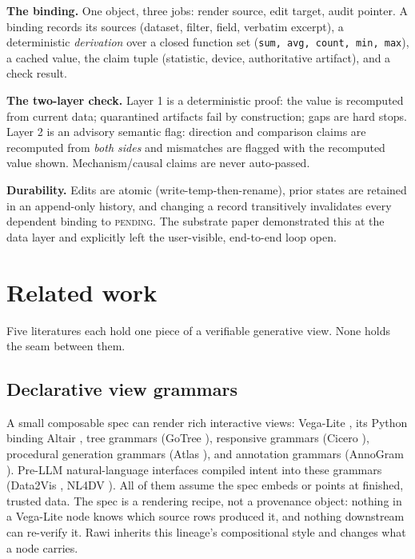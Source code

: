\documentclass[11pt]{article}
\begin{document}
\textbf{The binding.} One object, three jobs: render source, edit target, audit pointer.
A binding records its sources (dataset, filter, field, verbatim excerpt), a deterministic
\emph{derivation} over a closed function set (\texttt{sum, avg, count, min, max}), a cached
value, the claim tuple (statistic, device, authoritative artifact), and a check result.

\textbf{The two-layer check.} Layer 1 is a deterministic proof: the value is recomputed
from current data; quarantined artifacts fail by construction; gaps are hard stops.
Layer 2 is an advisory semantic flag: direction and comparison claims are recomputed from
\emph{both sides} and mismatches are flagged with the recomputed value shown.
Mechanism/causal claims are never auto-passed.

\textbf{Durability.} Edits are atomic (write-temp-then-rename), prior states are retained
in an append-only history, and changing a record transitively invalidates every dependent
binding to \textsc{pending}. The substrate paper demonstrated this at the data layer and
explicitly left the user-visible, end-to-end loop open.

\section{Related work}\label{sec:related}

Five literatures each hold one piece of a verifiable generative view. None holds the seam
between them.

\subsection{Declarative view grammars}

A small composable spec can render rich interactive views: Vega-Lite \cite{vegalite}, its
Python binding Altair \cite{altair}, tree grammars (GoTree \cite{gotree}), responsive
grammars (Cicero \cite{cicero}), procedural generation grammars (Atlas \cite{atlas}), and
annotation grammars (AnnoGram \cite{annogram}). Pre-LLM natural-language interfaces
compiled intent into these grammars (Data2Vis \cite{data2vis}, NL4DV \cite{nl4dv}). All
of them assume the spec embeds or points at finished, trusted data. The spec is a
rendering recipe, not a provenance object: nothing in a Vega-Lite node knows which source
rows produced it, and nothing downstream can re-verify it. Rawi inherits this lineage's
compositional style and changes what a node carries.
\end{document}
